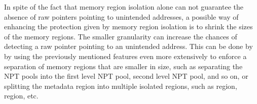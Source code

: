In spite of the fact that memory region isolation alone can not guarantee the
absence of raw pointers pointing to unintended addresses,
a possible way of enhancing the protection given by memory region isolation is
to shrink the sizes of the memory regions. The smaller granularity can increase
the chances of detecting a raw pointer pointing to an unintended address.
This can be done by by using the
previously mentioned features even more extensively to enforce a separation of
memory regions that are smaller in size,
such as separating the NPT pools into the first level NPT pool,
second level NPT pool, and so on, or splitting the \rustcore{} metadata region
into multiple isolated regions, such as  region, 
region, etc.

%

